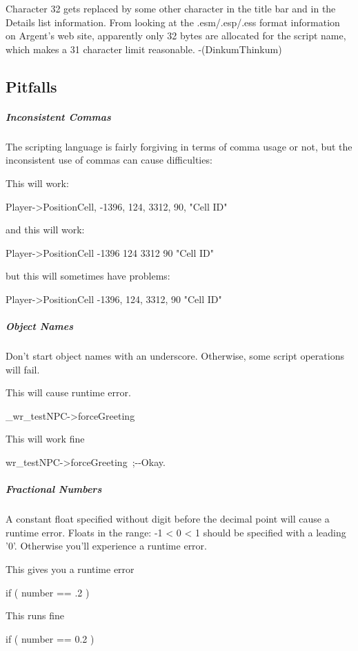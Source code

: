 \documentclass[
]{article}
\begin{document}
Character 32 gets replaced by some other character in the title bar and
in the Details list information. From looking at the .esm/.esp/.ess
format information on Argent's web site, apparently only 32 bytes are
allocated for the script name, which makes a 31 character limit
reasonable. -(DinkumThinkum)

\hypertarget{pitfalls}{%
\subsection{Pitfalls}\label{pitfalls}}

\hypertarget{inconsistent-commas}{%
\subparagraph{Inconsistent Commas}\label{inconsistent-commas}}

The scripting language is fairly forgiving in terms of comma usage or
not, but the inconsistent use of commas can cause difficulties:

This will work:

Player-\textgreater PositionCell, -1396, 124, 3312, 90, "Cell ID"

and this will work:

Player-\textgreater PositionCell -1396 124 3312 90 "Cell ID"

but this will sometimes have problems:

Player-\textgreater PositionCell -1396, 124, 3312, 90 "Cell ID"

\hypertarget{object-names}{%
\subparagraph{Object Names}\label{object-names}}

Don't start object names with an underscore. Otherwise, some script
operations will fail.

This will cause runtime error.

\_wr\_testNPC-\textgreater forceGreeting

This will work fine

wr\_testNPC-\textgreater forceGreeting~;-\/-Okay.

\hypertarget{fractional-numbers}{%
\subparagraph{Fractional Numbers}\label{fractional-numbers}}

A constant float specified without digit before the decimal point will
cause a runtime error. Floats in the range: -1 \textless{} 0 \textless{}
1 should be specified with a leading '0'. Otherwise you'll experience a
runtime error.

This gives you a runtime error

if ( number == .2 )~

This runs fine

if ( number == 0.2 )
\end{document}

